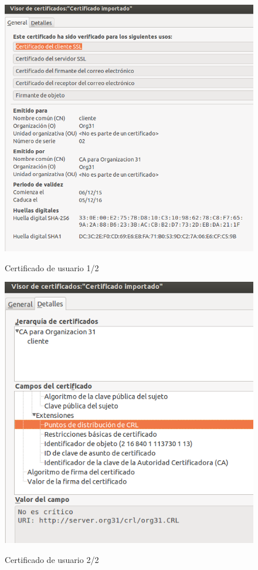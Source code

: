 \documentclass[]{article}
\begin{document}
\begin{figure}[h]
	\caption{Certificado de usuario 1/2}
	\centering
	\includegraphics[scale=0.5]{images/certs/usercert1.png}
	\label{fig:usercert1}
\end{figure}


\begin{figure}[h]
	\caption{Certificado de usuario 2/2}
	\centering
	\includegraphics[scale=0.5]{images/certs/usercert2.png}
	\label{fig:usercert2}
\end{figure}
\end{document}
